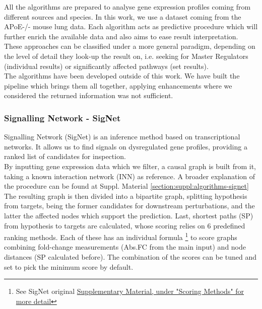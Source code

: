 All the algorithms are prepared to analyse gene expression profiles coming from different sources and species. In this work, we use a dataset coming from the APoE-/- \cite{LoSasso2016TheReduction} mouse lung data. Each algorithm acts as predictive procedure which will further enrich the available data and also aims to ease result interpretation. These approaches can be classified under a more general paradigm, depending on the  level of detail they look-up the result on, i.e. seeking for Master Regulators (individual results) or significantly affected pathways \cite{Faust2010PathwayExtraction} (set results).
\\

The algorithms have been developed outside of this work. We have built the pipeline which brings them all together, applying enhancements where we considered the returned information was not sufficient.
\\

\subsubsection{Signalling Network - SigNet}
Signalling Network (SigNet) \cite{Jaeger2014CausalCancer} is an inference method based on transcriptional networks. It allows us to find signals on dysregulated gene profiles, providing a ranked list of candidates for inspection. 
\\

By inputting gene expression data which we filter, a causal graph is built from it, taking a known interaction network (INN) as reference. A broader explanation of the procedure can be found at Suppl. Material \ref{section:suppl:algorithms-signet}
\\

The resulting graph is then divided into a bipartite graph, splitting hypothesis from targets, being the former candidates for downstream perturbations, and the latter the affected nodes which support the prediction. Last, shortest paths (SP) from hypothesis to targets are calculated, whose scoring relies on 6 predefined ranking methods. Each of these has an individual formula \footnote{See SigNet original \href{https://journals.sagepub.com/doi/suppl/10.1177/1087057114522690/suppl_file/10.1177_1087057114522690.pdf}{Supplementary Material, under "Scoring Methods" for more detail}} to score graphs combining fold-change measurements (Abs.FC from the main input) and node distances (SP calculated before). The combination of the scores can be tuned and set to pick the minimum score by default.


